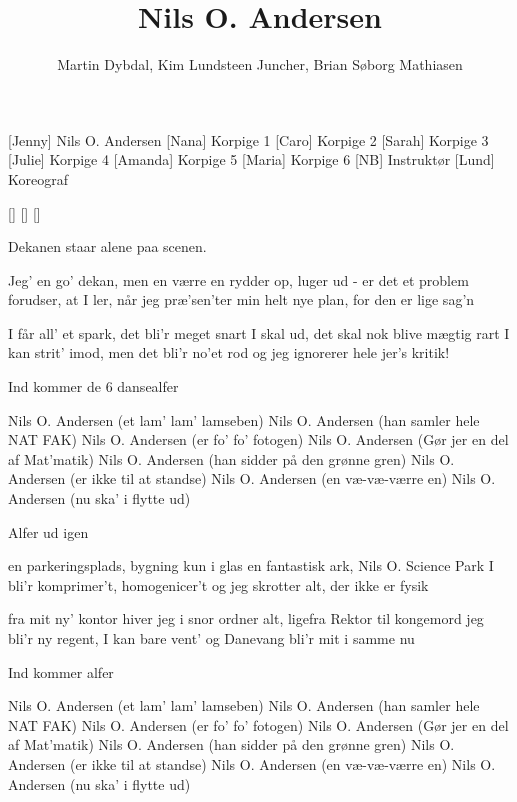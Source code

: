 \documentclass[a4paper,11pt]{article}
\title{Nils O. Andersen}
\author{Martin Dybdal, Kim Lundsteen Juncher, Brian Søborg Mathiasen}
\begin{document}
 \maketitle

 \begin{roles}
   [Jenny] Nils O. Andersen
   [Nana] Korpige 1
   [Caro] Korpige 2
   [Sarah] Korpige 3
   [Julie] Korpige 4
   [Amanda] Korpige 5
   [Maria] Korpige 6
   [NB] Instruktør
   [Lund] Koreograf
 \end{roles}

 \begin{props}
   []
   []
   []
 \end{props}

 \begin{song}
\scene Dekanen staar alene paa scenen.

Jeg' en go' dekan, men en værre en
rydder op, luger ud - er det et problem
forudser, at I ler, når jeg præ'sen'ter
min helt nye plan, for den er lige sag'n

I får all' et spark, det bli'r meget snart
I skal ud, det skal nok blive mægtig rart
I kan strit' imod, men det bli'r no'et rod
og jeg ignorerer hele jer's kritik!

\scene Ind kommer de 6 dansealfer

Nils O. Andersen (et lam' lam' lamseben)
Nils O. Andersen (han samler hele NAT FAK)
Nils O. Andersen (er fo' fo' fotogen)
Nils O. Andersen (Gør jer en del af Mat'matik)
Nils O. Andersen (han sidder på den grønne gren)
Nils O. Andersen (er ikke til at standse)
Nils O. Andersen (en væ-væ-værre en)
Nils O. Andersen (nu ska' i flytte ud)

\scene Alfer ud igen

en parkeringsplads, bygning kun i glas
en fantastisk ark, Nils O. Science Park
I bli'r komprimer't, homogenicer't
og jeg skrotter alt, der ikke er fysik

fra mit ny' kontor hiver jeg i snor
ordner alt, ligefra Rektor til kongemord
jeg bli'r ny regent, I kan bare vent'
og Danevang bli'r mit i samme nu

\scene Ind kommer alfer

Nils O. Andersen (et lam' lam' lamseben)
Nils O. Andersen (han samler hele NAT FAK)
Nils O. Andersen (er fo' fo' fotogen)
Nils O. Andersen (Gør jer en del af Mat'matik)
Nils O. Andersen (han sidder på den grønne gren)
Nils O. Andersen (er ikke til at standse)
Nils O. Andersen (en væ-væ-værre en)
Nils O. Andersen (nu ska' i flytte ud)


\end{song}
\end{document}
